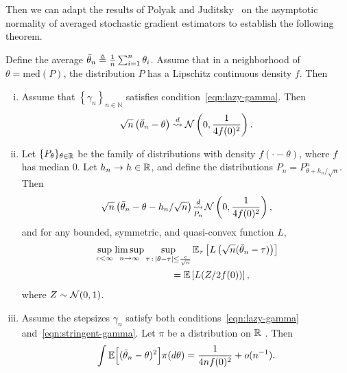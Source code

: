 Then we can adapt the results of Polyak and Juditsky~\cite{polyak1992acceleration}
on the asymptotic normality of averaged stochastic gradient estimators
to establish the following theorem.
\begin{thm}
  \label{thm:sgd}
  Define the average $\bar{\theta}_n \triangleq \frac{1}{n}
  \sum_{i = 1}^n \theta_i$. Assume
  that in a neighborhood
  of $\theta = \mbox{med}(P)$,
  the distribution $P$ has a Lipschitz continuous density $f$.
  Then
  \begin{enumerate}[(i)]
  \item \label{item:normal-sgd}
    Assume that $\left\{ \gamma_n \right\}_{n\in \mathbb N}$ satisfies
    condition~\eqref{eqn:lazy-gamma}.
    Then
    \begin{equation*}
      \sqrt{n}\left( \bar{\theta}_n - \theta\right)
      \stackrel{d}{\rightsquigarrow} \mathcal{N}\left(0,\frac{1}{4 f(0)^2}\right).
    \end{equation*}
  \item \label{item:sgd-regular}
    Let $\{P_\theta\}_{\theta \in \mathbb{R}}$ be the family of distributions
    with density $f(\cdot - \theta)$, where $f$ has median 0.
    Let $h_n \to h \in \mathbb{R}$, and define the distributions
    $P_n = P_{\theta + h_n/\sqrt{n}}^n$. Then
    \begin{equation*}
      \sqrt{n}\left(\bar{\theta}_n - \theta - h_n / \sqrt{n}\right)
      \mathop{\stackrel{d}{\rightsquigarrow}}_{P_n}
      \mathcal{N}\left(0, \frac{1}{4 f(0)^2}\right),
    \end{equation*}
    and for any bounded, symmetric, and quasi-convex function $L$,
    \begin{align} 
      & \sup_{c < \infty} \limsup_{n \to \infty}
      \sup_{\tau\,:\,|\theta-\tau| \leq \frac{c}{\sqrt{n} }}
      \mathbb{E}_\tau \left[ L\left( \sqrt{n}(\bar{\theta}_{n} - \tau) \right) \right] \nonumber 
      \\
      & \qquad \qquad \qquad \qquad = \mathbb E \left[L(Z/ 2 f(0)) \right],
        \label{eq:attaining_LAM}
    \end{align}
    where $Z \sim \mathcal{N}(0,1)$. 
  \item \label{item:sgd-ms-convergence} Assume the stepsizes $\gamma_n$
    satisfy both conditions~\eqref{eqn:lazy-gamma}
    and~\eqref{eqn:stringent-gamma}. Let
    $\pi$ be a distribution on $\mathbb{R}$ . Then
    \begin{align}
      \int \mathbb{E}\Big[( \bar{\theta}_n - \theta )^2\Big] \pi(d\theta)
      = \frac{1}{4 n f(0)^2} + o(n^{-1}).
      \label{eq:adaptive_3}
    \end{align}
  \end{enumerate}
\end{thm}

